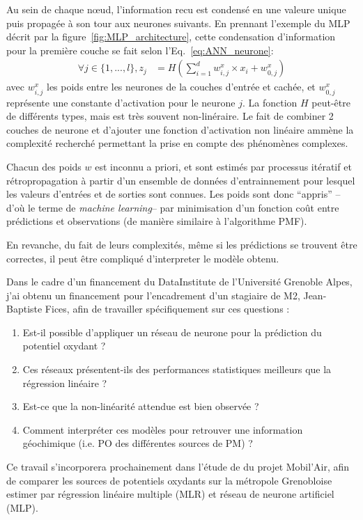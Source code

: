 Au sein de chaque nœud, l'information recu est condensé en une valeure unique puis propagée à
son tour aux neurones suivants. En prennant l'exemple du MLP décrit par la
figure~\ref{fig:MLP_architecture}, cette condensation d'information pour la première
couche se fait selon l'Eq.~\ref{eq:ANN_neurone}:
\begin{align}
    \label{eq:ANN_neurone}
    \forall j \in \{1, ..., l\}, z_j &= H\left( \sum_{i=1}^d w^x_{i,j} \times x_i + w^x_{0,j} \right)
\end{align}
avec $w^x_{i,j}$ les poids entre les neurones de la couches d'entrée et cachée, et
$w^x_{0,j}$ représente une constante d'activation pour le neurone $j$. La fonction $H$
peut-être de différents types, mais est très souvent non-linéraire. Le fait de combiner 2
couches de neurone et d'ajouter une fonction d'activation non linéaire ammène la
complexité recherché permettant la prise en compte des phénomènes complexes.

Chacun des poids $w$ est inconnu a priori, et sont estimés par processus itératif et
rétropropagation à partir d'un ensemble de données d'entrainnement pour lesquel les
valeurs d'entrées et de sorties sont connues. Les poids sont donc ``appris'' --d'où le
terme de \textit{machine learning}-- par minimisation d'un fonction coût entre prédictions
et observations (de manière similaire à l'algorithme PMF).

En revanche, du fait de leurs complexités, même si les prédictions se trouvent être
correctes, il peut être compliqué d'interpreter le modèle obtenu.


Dans le cadre d'un financement du DataInstitute de l'Université Grenoble Alpes, j'ai
obtenu un financement pour l'encadrement d'un stagiaire de M2, Jean-Baptiste Fices, afin
de travailler spécifiquement sur ces questions :
\begin{enumerate}
    \item Est-il possible d'appliquer un réseau de neurone pour la prédiction du potentiel
        oxydant ?
    \item Ces réseaux présentent-ils des performances statistiques meilleurs que la
        régression linéaire ?
    \item Est-ce que la non-linéarité attendue est bien observée ?
    \item Comment interpréter ces modèles pour retrouver une information géochimique (i.e.
        PO des différentes sources de PM) ?
\end{enumerate}
Ce travail s'incorporera prochainement dans l'étude de \cite{borlazaUrbaninprep.} du
projet Mobil'Air, afin de comparer les sources de potentiels oxydants sur la
métropole Grenobloise estimer par régression linéaire multiple (MLR) et réseau de neurone
artificiel (MLP).


